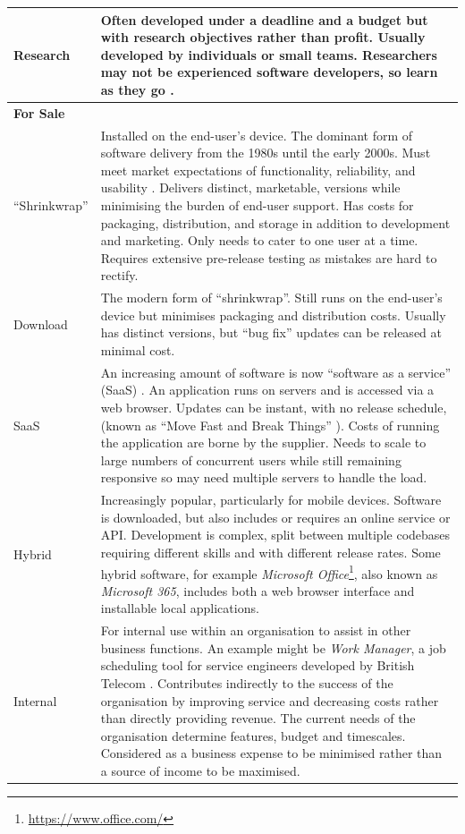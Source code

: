 \begin{longtable}{p{2.5cm} | p{10cm}}
\\
Research & Often developed under a deadline and a budget but with research objectives rather than profit. Usually developed by individuals or small teams. Researchers may not be experienced software developers, so learn as they go \citep{Trisovic2022}.
\\
\hline
\textbf{For Sale} & \\
\enquote{Shrinkwrap} & Installed on the end-user's device. The dominant form of software delivery from the 1980s until the early 2000s. Must meet market expectations of functionality, reliability, and usability \citep{Khoshgoftaar2001}. Delivers distinct, marketable, versions while minimising the burden of end-user support. Has costs for packaging, distribution, and storage in addition to development and marketing. Only needs to cater to one user at a time. Requires extensive pre-release testing as mistakes are hard to rectify.
\\
Download & The modern form of \enquote{shrinkwrap}. Still runs on the end-user's device but minimises packaging and distribution costs. Usually has distinct versions, but \enquote{bug fix} updates can be released at minimal cost.
\\
SaaS & An increasing amount of software is now \enquote{software as a service} (SaaS) \citep{Fan2009}. An application runs on servers and is accessed via a web browser. Updates can be instant, with no release schedule, (known as \enquote{Move Fast and Break Things} \citep{Taplin2018}). Costs of running the application are borne by the supplier. Needs to scale to large numbers of concurrent users while still remaining responsive so may need multiple servers to handle the load.
\\
Hybrid & Increasingly popular, particularly for mobile devices. Software is downloaded, but also includes or requires an online service or API. Development is complex, split between multiple codebases requiring different skills and with different release rates. Some hybrid software, for example \emph{Microsoft Office}\footnote{\url{https://www.office.com/}}, also known as \emph{Microsoft 365}, includes both a web browser interface and installable local applications.
\\
\hline
Internal & For internal use within an organisation to assist in other business functions. An example might be \emph{Work Manager}, a job scheduling tool for service engineers developed by British Telecom \citep{Garwood1997}. Contributes indirectly to the success of the organisation by improving service and decreasing costs rather than directly providing revenue. The current needs of the organisation determine features, budget and timescales. Considered as a business expense to be minimised rather than a source of income to be maximised.

\end{longtable}
